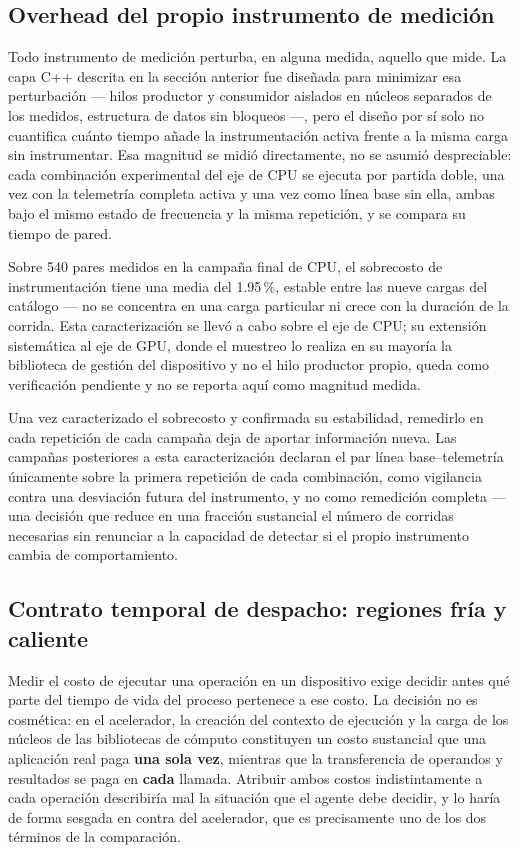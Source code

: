 \documentclass[12pt,oneside,spanish]{book}
\begin{document}
\subsection{Overhead del propio instrumento de medición}
\label{sec:overhead-instrumento}

Todo instrumento de medición perturba, en alguna medida, aquello que mide. La capa C++ descrita en la sección anterior fue diseñada para minimizar esa perturbación --- hilos productor y consumidor aislados en núcleos separados de los medidos, estructura de datos sin bloqueos ---, pero el diseño por sí solo no cuantifica cuánto tiempo añade la instrumentación activa frente a la misma carga sin instrumentar. Esa magnitud se midió directamente, no se asumió despreciable: cada combinación experimental del eje de CPU se ejecuta por partida doble, una vez con la telemetría completa activa y una vez como línea base sin ella, ambas bajo el mismo estado de frecuencia y la misma repetición, y se compara su tiempo de pared.

Sobre 540 pares medidos en la campaña final de CPU, el sobrecosto de instrumentación tiene una media del 1.95\,\%, estable entre las nueve cargas del catálogo --- no se concentra en una carga particular ni crece con la duración de la corrida. Esta caracterización se llevó a cabo sobre el eje de CPU; su extensión sistemática al eje de GPU, donde el muestreo lo realiza en su mayoría la biblioteca de gestión del dispositivo y no el hilo productor propio, queda como verificación pendiente y no se reporta aquí como magnitud medida.

Una vez caracterizado el sobrecosto y confirmada su estabilidad, remedirlo en cada repetición de cada campaña deja de aportar información nueva. Las campañas posteriores a esta caracterización declaran el par línea base--telemetría únicamente sobre la primera repetición de cada combinación, como vigilancia contra una desviación futura del instrumento, y no como remedición completa --- una decisión que reduce en una fracción sustancial el número de corridas necesarias sin renunciar a la capacidad de detectar si el propio instrumento cambia de comportamiento.

\subsection{Contrato temporal de despacho: regiones fría y caliente}
\label{sec:contrato-coldwarm}

Medir el costo de ejecutar una operación en un dispositivo exige decidir antes qué parte del tiempo de vida del proceso pertenece a ese costo. La decisión no es cosmética: en el acelerador, la creación del contexto de ejecución y la carga de los núcleos de las bibliotecas de cómputo constituyen un costo sustancial que una aplicación real paga \textbf{una sola vez}, mientras que la transferencia de operandos y resultados se paga en \textbf{cada} llamada. Atribuir ambos costos indistintamente a cada operación describiría mal la situación que el agente debe decidir, y lo haría de forma sesgada en contra del acelerador, que es precisamente uno de los dos términos de la comparación.
\end{document}
